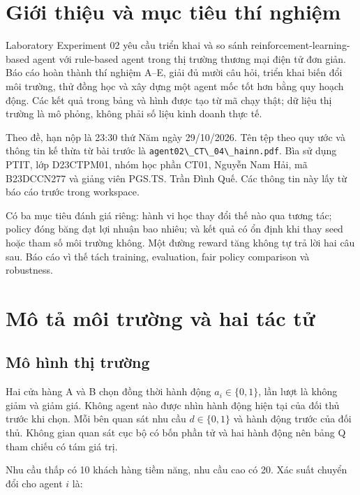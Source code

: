\section{Giới thiệu và mục tiêu thí
nghiệm}\label{giux1edbi-thiux1ec7u-vuxe0-mux1ee5c-tiuxeau-thuxed-nghiux1ec7m}

Laboratory Experiment 02 yêu cầu triển khai và so sánh
reinforcement-learning-based agent với rule-based agent trong thị trường
thương mại điện tử đơn giản. Báo cáo hoàn thành thí nghiệm A--E, giải đủ
mười câu hỏi, triển khai biến đổi môi trường, thử đồng học và xây dựng
một agent mốc tốt hơn bằng quy hoạch động. Các kết quả trong bảng và
hình được tạo từ mã chạy thật; dữ liệu thị trường là mô phỏng, không
phải số liệu kinh doanh thực tế. \cite{lab}

Theo đề, hạn nộp là 23:30 thứ Năm ngày 29/10/2026. Tên tệp theo quy ước
và thông tin kế thừa từ bài trước là
\passthrough{\lstinline!agent02\_CT\_04\_hainn.pdf!}. Bìa sử dụng PTIT,
lớp D23CTPM01, nhóm học phần CT01, Nguyễn Nam Hải, mã B23DCCN277 và
giảng viên PGS.TS. Trần Đình Quế. Các thông tin này lấy từ báo cáo trước
trong workspace.

Có ba mục tiêu đánh giá riêng: hành vi học thay đổi thế nào qua tương
tác; policy đóng băng đạt lợi nhuận bao nhiêu; và kết quả có ổn định khi
thay seed hoặc tham số môi trường không. Một đường reward tăng không tự
trả lời hai câu sau. Báo cáo vì thế tách training, evaluation, fair
policy comparison và robustness.

\section{Mô tả môi trường và hai tác
tử}\label{muxf4-tux1ea3-muxf4i-trux1b0ux1eddng-vuxe0-hai-tuxe1c-tux1eed}

\subsection{Mô hình thị
trường}\label{muxf4-huxecnh-thux1ecb-trux1b0ux1eddng}

Hai cửa hàng A và B chọn đồng thời hành động \(a_i\in\{0,1\}\), lần lượt
là không giảm và giảm giá. Không agent nào được nhìn hành động hiện tại
của đối thủ trước khi chọn. Mỗi bên quan sát nhu cầu \(d\in\{0,1\}\) và
hành động trước của đối thủ. Không gian quan sát cục bộ có bốn phần tử
và hai hành động nên bảng Q tham chiếu có tám giá trị.

Nhu cầu thấp có 10 khách hàng tiềm năng, nhu cầu cao có 20. Xác suất
chuyển đổi cho agent \(i\) là:

